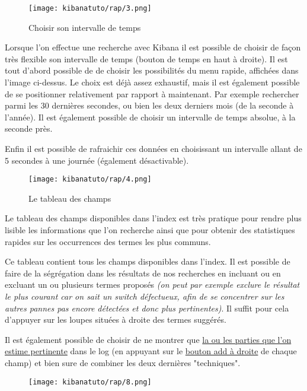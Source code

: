 \begin{figure}[H]
\center
\texttt{[image: kibanatuto/rap/3.png]}
\label{fig:kibanatuto3}
\caption{Choisir son intervalle de temps}
\end{figure}
Lorsque l'on effectue une recherche avec Kibana il est possible de choisir de façon
très flexible son intervalle de temps (bouton de temps en haut à droite).
Il est tout d'abord possible de de choisir les possibilités du menu rapide, affichées
dans l'image ci-dessus. Le choix est déjà assez exhaustif, mais il est également 
possible de se positionner relativement par rapport à maintenant. Par exemple rechercher 
parmi les 30 dernières secondes, ou bien les deux derniers mois (de la seconde à 
l'année). Il est également possible de choisir un intervalle de temps absolue, à 
la seconde près.

Enfin il est possible de rafraichir ces données en choisissant un intervalle allant
de 5 secondes à une journée (également désactivable).
\newpage
\begin{figure}[H]
\center
\texttt{[image: kibanatuto/rap/4.png]}
\label{fig:kibanatuto4}
\caption{Le tableau des champs}
\end{figure}

Le tableau des champs disponibles dans l'index est très pratique pour rendre plus 
lisible les informations que l'on recherche ainsi que pour obtenir des statistiques 
rapides sur les occurrences des termes les plus communs.

Ce tableau contient tous les champs disponibles dans l'index. Il est possible de
faire de la ségrégation dans les résultats de nos recherches en incluant ou en   
excluant un ou plusieurs termes proposés {\footnotesize\textit{(on peut par exemple exclure le résultat 
le plus courant car on sait un switch défectueux, afin de se concentrer sur les autres
pannes pas encore détectées et donc plus pertinentes)}}. Il suffit pour cela d'appuyer
sur les loupes situées à droite des termes suggérés.


Il est également possible de choisir de ne montrer que \hyperref[fig:kibanatuto6]{la ou les parties que l'on 
estime pertinente} dans le log (en appuyant sur le \hyperref[fig:kibanatuto5]{bouton 
add à droite} de chaque champ) et bien sure de combiner les deux dernières "techniques".
\begin{figure}[H]
\begin{flushright}
\texttt{[image: kibanatuto/rap/8.png]}
\label{fig:kibanatuto5}
\end{flushright}%
\end{figure}


